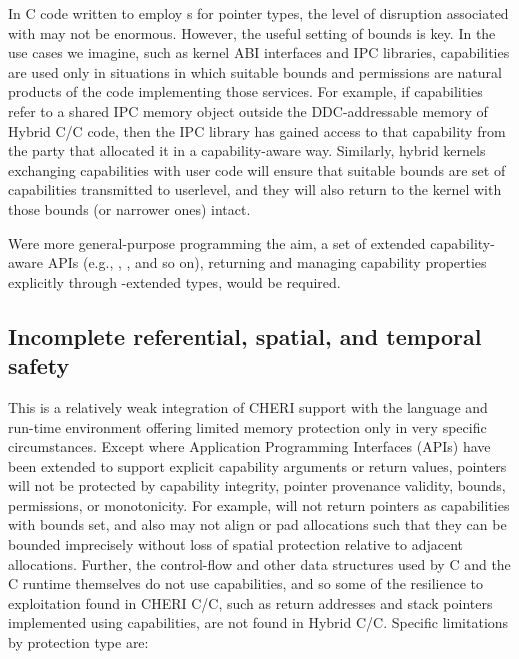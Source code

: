 \documentclass[12pt,twoside,openright,a4paper]{article}
\newcommand{\ccode}[1]{{\small\ttfamily{#1}}}
\newcommand{\cfunc}[1]{{\ccode{#1()}}}
\newcommand{\uucap}{{\ccode{\_\_capability}}\xspace}
\newcommand{\note}[2]{{\color{blue}[ Note: #1 - #2]}}
\renewcommand{\note}[2]{\relax\ifhmode\unskip\fi}
\newcommand{\psnote}[1]{\note{#1}{Peter S.}}
\newcommand{\jhbnote}[1]{\note{#1}{John B.}}
\newcommand*{\cpp}{\texorpdfstring{C\textsmaller[2]{\protect\nolinebreak[4]\hspace{-.05em}\raisebox{.45ex}{\textbf{++}}}}{C++}}
\newcommand*{\COrCpp}{C/\cpp{}}
\newcommand*{\purecapCOrCpp}{CHERI \COrCpp{}}
\newcommand*{\hybridCOrCpp}{Hybrid \COrCpp{}}
\begin{document}
In C code written to employ \ccode{typedef}s for pointer types, the level
of disruption associated with \uucap{} may not be enormous.
However, the useful setting of bounds is key.
In the use cases we imagine, such as kernel ABI interfaces and IPC libraries,
capabilities are used only in situations in which suitable bounds and
permissions are natural products of the code implementing those services.
For example, if capabilities refer to a shared IPC memory object outside the
DDC-addressable memory of \hybridCOrCpp{} code, then the IPC library has
gained access to that capability from the party that allocated it in a
capability-aware way.
Similarly, hybrid kernels exchanging capabilities with user code will ensure
that suitable bounds are set of capabilities transmitted to userlevel, and
they will also return to the kernel with those bounds (or narrower ones)
intact.

Were more general-purpose programming the aim, a set of extended
capability-aware APIs (e.g., \ccode{malloc\_c()}, \ccode{mmap\_c()}, and so
on), returning and managing capability properties explicitly through
\uucap{}-extended types, would be required.

\jhbnote{Somewhere we should perhaps point out that existing hybrid
  ABIs don't try to ``respect'' DDC.  In particular, as far as I am
  aware, \ccode{mmap()} will happily return integer pointers that are
  out of bounds of DDC if userland has constrained its DDC.  I think
  the expectation is that if hybrid userland wants to modify DDC, it
  has to wrap system calls, etc.}

\subsection{Incomplete referential, spatial, and temporal safety}

\psnote{Hybrid C/C++ / This ?}
This is a relatively weak integration of CHERI support with the language and
run-time environment offering limited memory protection only in very specific
circumstances.
Except where Application Programming Interfaces (APIs) have been extended to
support explicit capability arguments or return values, pointers will not
be protected by capability integrity, pointer provenance validity, bounds,
permissions, or monotonicity.
For example, \cfunc{malloc} will not return pointers as capabilities with
bounds set, and also may not align or pad allocations such that they can be
bounded imprecisely without loss of spatial protection relative to adjacent
allocations.
Further, the control-flow and other data structures used by C and the C
runtime themselves do not use capabilities, and so some of the resilience to
exploitation found in \purecapCOrCpp{}, such as return addresses and stack
pointers implemented using capabilities, are not found in \hybridCOrCpp{}.
Specific limitations by protection type are:
\end{document}

